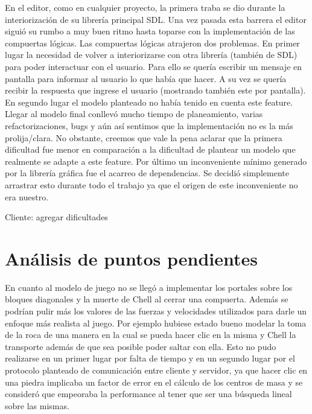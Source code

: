 \documentclass[a4paper]{article}
\begin{document}
En el editor, como en cualquier proyecto, la primera traba se dio durante la interiorización de su librería principal SDL. Una vez pasada esta barrera el editor siguió su rumbo a muy buen ritmo hasta toparse con la implementación de las compuertas lógicas.
Las compuertas lógicas atrajeron dos problemas. En primer lugar la necesidad de volver a interiorizarse con otra librería (también de SDL) para poder interactuar con el usuario. Para ello se quería escribir un mensaje en pantalla para informar al usuario lo que había que hacer. A su vez se quería recibir la respuesta que ingrese el usuario (mostrando también este por pantalla).  En segundo lugar el modelo planteado no había tenido en cuenta este feature. Llegar al modelo final conllevó mucho tiempo de planeamiento, varias refactorizaciones, bugs y aún así sentimos que la implementación no es la más prolija/clara. No obstante, creemos que vale la pena aclarar que la primera dificultad fue menor en comparación a la dificultad de plantear un modelo que realmente se adapte a este feature.
Por último un inconveniente mínimo generado por la librería gráfica fue el acarreo de dependencias. Se decidió simplemente arrastrar esto durante todo el trabajo ya que el origen de este inconveniente no era nuestro.


Cliente: agregar dificultades

\section{Análisis de puntos pendientes}

En cuanto al modelo de juego no se llegó a implementar los portales sobre los bloques diagonales y la muerte de Chell al cerrar una compuerta. Además se podrían pulir más los valores de las fuerzas y velocidades utilizados para darle un enfoque más realista al juego. Por ejemplo hubiese estado bueno modelar la toma de la roca de una manera en la cual se pueda hacer clic en la misma y Chell la transporte además de que sea posible poder saltar con ella. Esto no pudo realizarse en un primer lugar por falta de tiempo y en un segundo lugar por el protocolo planteado de comunicación entre cliente y servidor, ya que hacer clic en una piedra implicaba un factor de error en el cálculo de los centros de masa y se consideró que empeoraba la performance al tener que ser una búsqueda lineal sobre las mismas. 
\end{document}

